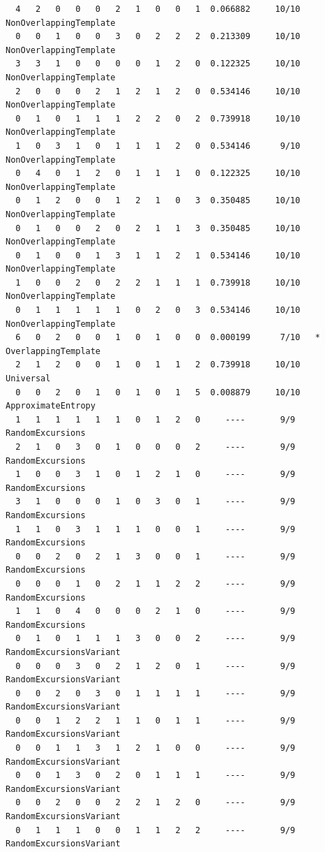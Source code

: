 \documentclass[12pt, titlepage]{report}
\theoremstyle{definition}
\begin{document}
{\begin{verbatim}
  4   2   0   0   0   2   1   0   0   1  0.066882     10/10      NonOverlappingTemplate
  0   0   1   0   0   3   0   2   2   2  0.213309     10/10      NonOverlappingTemplate
  3   3   1   0   0   0   0   1   2   0  0.122325     10/10      NonOverlappingTemplate
  2   0   0   0   2   1   2   1   2   0  0.534146     10/10      NonOverlappingTemplate
  0   1   0   1   1   1   2   2   0   2  0.739918     10/10      NonOverlappingTemplate
  1   0   3   1   0   1   1   1   2   0  0.534146      9/10      NonOverlappingTemplate
  0   4   0   1   2   0   1   1   1   0  0.122325     10/10      NonOverlappingTemplate
  0   1   2   0   0   1   2   1   0   3  0.350485     10/10      NonOverlappingTemplate
  0   1   0   0   2   0   2   1   1   3  0.350485     10/10      NonOverlappingTemplate
  0   1   0   0   1   3   1   1   2   1  0.534146     10/10      NonOverlappingTemplate
  1   0   0   2   0   2   2   1   1   1  0.739918     10/10      NonOverlappingTemplate
  0   1   1   1   1   1   0   2   0   3  0.534146     10/10      NonOverlappingTemplate
  6   0   2   0   0   1   0   1   0   0  0.000199      7/10   *  OverlappingTemplate
  2   1   2   0   0   1   0   1   1   2  0.739918     10/10      Universal
  0   0   2   0   1   0   1   0   1   5  0.008879     10/10      ApproximateEntropy
  1   1   1   1   1   1   0   1   2   0     ----       9/9       RandomExcursions
  2   1   0   3   0   1   0   0   0   2     ----       9/9       RandomExcursions
  1   0   0   3   1   0   1   2   1   0     ----       9/9       RandomExcursions
  3   1   0   0   0   1   0   3   0   1     ----       9/9       RandomExcursions
  1   1   0   3   1   1   1   0   0   1     ----       9/9       RandomExcursions
  0   0   2   0   2   1   3   0   0   1     ----       9/9       RandomExcursions
  0   0   0   1   0   2   1   1   2   2     ----       9/9       RandomExcursions
  1   1   0   4   0   0   0   2   1   0     ----       9/9       RandomExcursions
  0   1   0   1   1   1   3   0   0   2     ----       9/9       RandomExcursionsVariant
  0   0   0   3   0   2   1   2   0   1     ----       9/9       RandomExcursionsVariant
  0   0   2   0   3   0   1   1   1   1     ----       9/9       RandomExcursionsVariant
  0   0   1   2   2   1   1   0   1   1     ----       9/9       RandomExcursionsVariant
  0   0   1   1   3   1   2   1   0   0     ----       9/9       RandomExcursionsVariant
  0   0   1   3   0   2   0   1   1   1     ----       9/9       RandomExcursionsVariant
  0   0   2   0   0   2   2   1   2   0     ----       9/9       RandomExcursionsVariant
  0   1   1   1   0   0   1   1   2   2     ----       9/9       RandomExcursionsVariant

\end{verbatim}}
\end{document}
